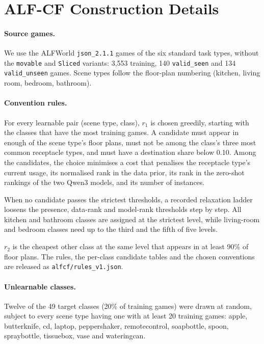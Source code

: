 \section{ALF-CF Construction Details}
\label{app:alfcf}

\paragraph{Source games.}
We use the ALFWorld \texttt{json\_2.1.1} games of the six standard task types, without the \texttt{movable} and \texttt{Sliced} variants: 3,553 training, 140 \texttt{valid\_seen} and 134 \texttt{valid\_unseen} games. Scene types follow the floor-plan numbering (kitchen, living room, bedroom, bathroom).

\paragraph{Convention rules.}
For every learnable pair (scene type, class), $r_1$ is chosen greedily, starting with the classes that have the most training games. A candidate must appear in enough of the scene type's floor plans, must not be among the class's three most common receptacle types, and must have a destination share below 0.10. Among the candidates, the choice minimises a cost that penalises the receptacle type's current usage, its normalised rank in the data prior, its rank in the zero-shot rankings of the two Qwen3 models, and its number of instances.

When no candidate passes the strictest thresholds, a recorded relaxation ladder loosens the presence, data-rank and model-rank thresholds step by step. All kitchen and bathroom classes are assigned at the strictest level, while living-room and bedroom classes need up to the third and the fifth of five levels.

$r_2$ is the cheapest other class at the same level that appears in at least 90\% of floor plans. The rules, the per-class candidate tables and the chosen conventions are released as \texttt{alfcf/rules\_v1.json}.

\paragraph{Unlearnable classes.}
Twelve of the 49 target classes (20\% of training games) were drawn at random, subject to every scene type having one with at least 20 training games: apple, butterknife, cd, laptop, peppershaker, remotecontrol, soapbottle, spoon, spraybottle, tissuebox, vase and wateringcan.

